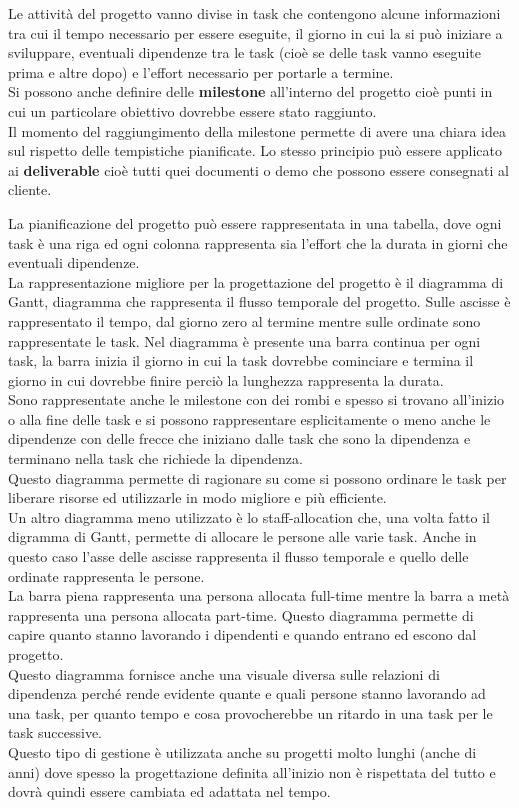 Le attività del progetto vanno divise in task che contengono alcune informazioni tra cui il tempo necessario per essere eseguite, il giorno in cui la si può iniziare a sviluppare, eventuali dipendenze tra le task (cioè se delle task vanno eseguite prima e altre dopo) e l'effort necessario per portarle a termine.\\
Si possono anche definire delle \textbf{milestone} all'interno del progetto cioè punti in cui un particolare obiettivo dovrebbe essere stato raggiunto.\\
Il momento del raggiungimento della milestone permette di avere una chiara idea sul rispetto delle tempistiche pianificate.
Lo stesso principio può essere applicato ai \textbf{deliverable} cioè tutti quei documenti o demo che possono essere consegnati al cliente.

La pianificazione del progetto può essere rappresentata in una tabella, dove ogni task è una riga ed ogni colonna rappresenta sia l'effort che la durata in giorni che eventuali dipendenze.\\
La rappresentazione migliore per la progettazione del progetto è il diagramma di Gantt, diagramma che rappresenta il flusso temporale del progetto.
Sulle ascisse è rappresentato il tempo, dal giorno zero al termine mentre sulle ordinate sono rappresentate le task.
Nel diagramma è presente una barra continua per ogni task, la barra inizia il giorno in cui la task dovrebbe cominciare e termina il giorno in cui dovrebbe finire perciò la lunghezza rappresenta la durata.\\
Sono rappresentate anche le milestone con dei rombi e spesso si trovano all'inizio o alla fine delle task e si possono rappresentare esplicitamente o meno anche le dipendenze con delle frecce che iniziano dalle task che sono la dipendenza e terminano nella task che richiede la dipendenza.\\
Questo diagramma permette di ragionare su come si possono ordinare le task per liberare risorse ed utilizzarle in modo migliore e più efficiente.\\
Un altro diagramma meno utilizzato è lo staff-allocation che, una volta fatto il digramma di Gantt, permette di allocare le persone alle varie task.
Anche in questo caso l'asse delle ascisse rappresenta il flusso temporale e quello delle ordinate rappresenta le persone.\\
La barra piena rappresenta una persona allocata full-time mentre la barra a metà rappresenta una persona allocata part-time.
Questo diagramma permette di capire quanto stanno lavorando i dipendenti e quando entrano ed escono dal progetto.\\
Questo diagramma fornisce anche una visuale diversa sulle relazioni di dipendenza perché rende evidente quante e quali persone stanno lavorando ad una task, per quanto tempo e cosa provocherebbe un ritardo in una task per le task successive.\\
Questo tipo di gestione è utilizzata anche su progetti molto lunghi (anche di anni) dove spesso la progettazione definita all'inizio non è rispettata del tutto e dovrà quindi essere cambiata ed adattata nel tempo.


